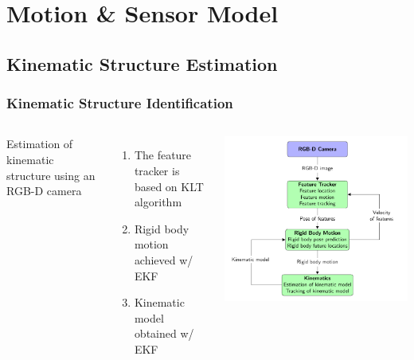 \documentclass{beamer}
\begin{document}
\section{Motion \& Sensor Model}
\subsection{Kinematic Structure Estimation}

\begin{frame}
\frametitle{Kinematic Structure Identification}


\begin{columns}[c] %
Estimation of kinematic structure using an RGB-D camera \vspace{.2cm}
\begin{enumerate}
\item The feature tracker is based on KLT algorithm \cite{p3}\vspace{.2cm}
\item Rigid body motion achieved w/ EKF\vspace{.2cm}
\item Kinematic model obtained w/ EKF
\end{enumerate}
   
    \includegraphics[scale=0.52]{RecursiveEstimation.pdf}
	\centering
\end{columns}

\end{frame}
\end{document}
